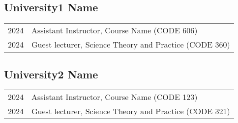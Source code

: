 
\subsection*{University1 Name}
% 
\begin{longtable}[l]{@{}p{} p{}}

    2024 & Assistant Instructor, Course Name (CODE 606) \\
    
    2024 & Guest lecturer, Science Theory and Practice (CODE 360) \\

\end{longtable}


\subsection*{University2 Name}
% 
\begin{longtable}[l]{@{}p{} p{}}

    2024 & Assistant Instructor, Course Name (CODE 123) \\
    
    2024 & Guest lecturer, Science Theory and Practice (CODE 321) \\

\end{longtable}